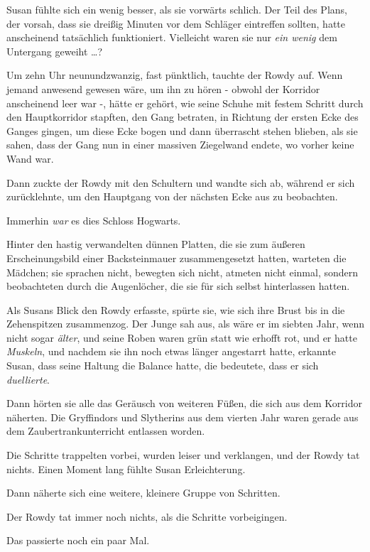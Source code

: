 {Susan fühlte sich ein wenig besser, als sie vorwärts schlich. Der Teil des Plans, der vorsah, dass sie dreißig Minuten vor dem Schläger eintreffen sollten, hatte anscheinend tatsächlich funktioniert. Vielleicht waren sie nur \emph{ein wenig} dem Untergang geweiht …?

Um zehn Uhr neunundzwanzig, fast pünktlich, tauchte der Rowdy auf. Wenn jemand anwesend gewesen wäre, um ihn zu hören - obwohl der Korridor anscheinend leer war -, hätte er gehört, wie seine Schuhe mit festem Schritt durch den Hauptkorridor stapften, den Gang betraten, in Richtung der ersten Ecke des Ganges gingen, um diese Ecke bogen und dann überrascht stehen blieben, als sie sahen, dass der Gang nun in einer massiven Ziegelwand endete, wo vorher keine Wand war.

Dann zuckte der Rowdy mit den Schultern und wandte sich ab, während er sich zurücklehnte, um den Hauptgang von der nächsten Ecke aus zu beobachten.

Immerhin \emph{war} es dies Schloss Hogwarts.

Hinter den hastig verwandelten dünnen Platten, die sie zum äußeren Erscheinungsbild einer Backsteinmauer zusammengesetzt hatten, warteten die Mädchen; sie sprachen nicht, bewegten sich nicht, atmeten nicht einmal, sondern beobachteten durch die Augenlöcher, die sie für sich selbst hinterlassen hatten.

Als Susans Blick den Rowdy erfasste, spürte sie, wie sich ihre Brust bis in die Zehenspitzen zusammenzog. Der Junge sah aus, als wäre er im siebten Jahr, wenn nicht sogar \emph{älter}, und seine Roben waren grün statt wie erhofft rot, und er hatte \emph{Muskeln}, und nachdem sie ihn noch etwas länger angestarrt hatte, erkannte Susan, dass seine Haltung die Balance hatte, die bedeutete, dass er sich \emph{duellierte}.

Dann hörten sie alle das Geräusch von weiteren Füßen, die sich aus dem Korridor näherten. Die Gryffindors und Slytherins aus dem vierten Jahr waren gerade aus dem Zaubertrankunterricht entlassen worden.

Die Schritte trappelten vorbei, wurden leiser und verklangen, und der Rowdy tat nichts. Einen Moment lang fühlte Susan Erleichterung.

Dann näherte sich eine weitere, kleinere Gruppe von Schritten.

Der Rowdy tat immer noch nichts, als die Schritte vorbeigingen.

Das passierte noch ein paar Mal.

}
